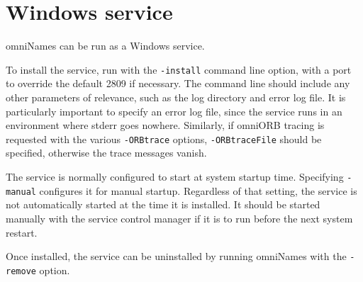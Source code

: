 \documentclass[a4paper,11pt,twoside]{article}
\newcommand{\cmdline}[1]{\texttt{#1}}
\begin{document}
\section{Windows service}

omniNames can be run as a Windows service.

To install the service, run with the \cmdline{-install} command line
option, with a port to override the default 2809 if necessary. The
command line should include any other parameters of relevance, such as
the log directory and error log file. It is particularly important to
specify an error log file, since the service runs in an environment
where stderr goes nowhere. Similarly, if omniORB tracing is requested
with the various \cmdline{-ORBtrace} options, \cmdline{-ORBtraceFile}
should be specified, otherwise the trace messages vanish.

The service is normally configured to start at system startup time.
Specifying \cmdline{-manual} configures it for manual startup.
Regardless of that setting, the service is not automatically started
at the time it is installed. It should be started manually with the
service control manager if it is to run before the next system
restart.

Once installed, the service can be uninstalled by running omniNames
with the \cmdline{-remove} option.
\end{document}
